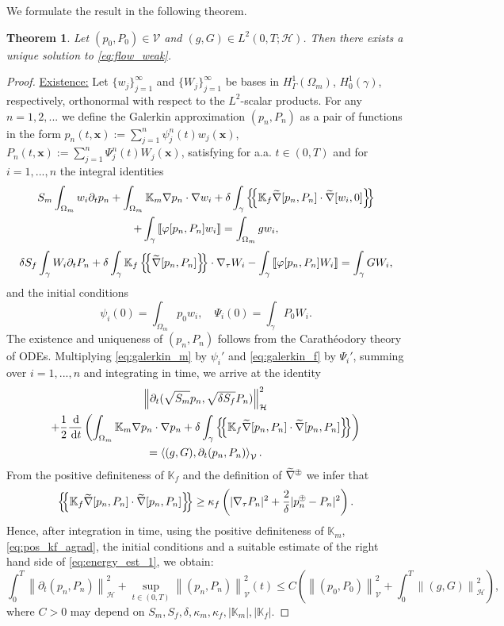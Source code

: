 \documentclass[a4paper]{article}
\newtheorem{theorem}{Theorem}
\def\agrad{\widetilde\nabla}
\def\avg#1{\left\{\mskip-5mu\left\{#1\right\}\mskip-5mu\right\}}
\def\d {\,{\rm d}}
\def\ddt#1{\frac{\d #1}{\d t}}
\def\dt{\prtl_t}
\def\dual#1#2{\left\langle #1,#2\right\rangle}
\def\Hf{\mathcal H}
\def\jmp#1{\left\llbracket #1 \right\rrbracket}
\def\norm#1{\left\|#1\right\|}
\def\pphi{{\varphi}}
\def\prtl{\partial}
\def\tn#1{{\mathbb{#1}}}    %
\def\Vf{{\mathcal V}} %
\def\vc#1{\mathbf{\boldsymbol{#1}}}     %
\def\xx{\vc x}
\newcommand{\eq}[1]{\begin{equation}#1\end{equation}}
\newcommand{\eqs}[1]{\begin{equation*}#1\end{equation*}}
\newcommand{\ml}[1]{\begin{multline}#1\end{multline}}
\newcommand{\opm}{ %
  {\mathbin{
    \mathchoice
      {\buildcirclepm{\displaystyle     }{0.14ex}{0.95}{0.05ex}{.7}}
      {\buildcirclepm{\textstyle        }{0.14ex}{0.95}{0.05ex}{.7}}
      {\buildcirclepm{\scriptstyle      }{0.13ex}{0.955}{0.04ex}{.55}}
      {\buildcirclepm{\scriptscriptstyle}{0.08ex}{0.95}{0.03ex}{.45}}
  }} 
}
\newcommand\buildcirclepm[5]{%
  \begin{tikzpicture}[baseline=(X.base), inner sep=-#5, outer sep=-.65]
    \node[draw,circle,line width=#4] (X)  {\footnotesize\raisebox{#2}{\scalebox{#3}{$#1\pm$}}};
  \end{tikzpicture}%
}
\begin{document}
We formulate the result in the following theorem.
% 
\begin{theorem}
Let $(p_0,P_0)\in\Vf$ and $(g,G)\in L^2(0,T;\Hf)$.
Then there exists a unique solution to \eqref{eq:flow_weak}.
\end{theorem}
\begin{proof}
\underline{Existence:}
Let $\{w_j\}_{j=1}^\infty$ and $\{W_j\}_{j=1}^\infty$ be bases in $H^1_\Gamma(\Omega_m)$, $H^1_0(\gamma)$, respectively, orthonormal with respect to the $L^2$-scalar products.
For any $n=1,2,...$ we define the Galerkin approximation $(p_n,P_n)$ as a pair of functions in the form $p_n(t,\xx):=\sum_{j=1}^n\psi_j^n(t)w_j(\xx)$, $P_n(t,\xx):=\sum_{j=1}^n\Psi_j^n(t)W_j(\xx)$, satisfying for a.a. $t\in(0,T)$ and for $i=1,...,n$ the integral identities
\ml{ \label{eq:galerkin_m} S_m\int_{\Omega_m}w_i\dt p_n + \int_{\Omega_m}\tn K_m\nabla p_n\cdot\nabla w_i + \delta\int_\gamma\avg{\tn K_f\agrad[p_n,P_n]\cdot\agrad[w_i,0]}\\
+ \int_\gamma\jmp{\pphi[p_n,P_n]w_i} = \int_{\Omega_m}g w_i, }
\eq{ \label{eq:galerkin_f} \delta S_f\int_\gamma W_i\dt P_n + \delta\int_\gamma\tn K_f\avg{\agrad[p_n,P_n]}\cdot\nabla_\tau W_i - \int_\gamma\jmp{\pphi[p_n,P_n]W_i} = \int_\gamma G W_i, }
and the initial conditions
\eqs{ \psi_i(0)=\int_{\Omega_m}p_0w_i, \quad \Psi_i(0)=\int_\gamma P_0W_i. }
The existence and uniqueness of $(p_n,P_n)$ follows from the Carath\'eodory theory of ODEs.
Multiplying \eqref{eq:galerkin_m} by $\psi_i'$ and \eqref{eq:galerkin_f} by $\Psi_i'$, summing over $i=1,...,n$ and integrating in time, we arrive at the identity
\ml{\label{eq:energy_est_1} \norm{\dt(\sqrt{S_m} p_n,\sqrt{\delta S_f} P_n)}_\Hf^2\\
+ \frac12\ddt{}\left(\int_{\Omega_m}\tn K_m\nabla p_n\cdot\nabla p_n
+ \delta\int_\gamma\avg{\tn K_f\agrad[p_n,P_n]\cdot\agrad[p_n,P_n]}\right)\\
= \dual{(g,G)}{\dt(p_n,P_n)}_\Vf. }
From the positive definiteness of $\tn K_f$ and the definition of $\agrad^\opm$ we infer that
\eq{ \label{eq:pos_kf_agrad} \avg{\tn K_f\agrad[p_n,P_n]\cdot\agrad[p_n,P_n]} \ge \kappa_f\left(|\nabla_\tau P_n|^2 + \frac2\delta|p_n^\opm-P_n|^2\right). }
Hence, after integration in time, using the positive definiteness of $\tn K_m$, \eqref{eq:pos_kf_agrad}, the initial conditions and a suitable estimate of the right hand side of \eqref{eq:energy_est_1}, we obtain:
\eq{ \label{eq:energy_est_flow} \int_0^T\norm{\dt(p_n,P_n)}_\Hf^2 + \sup_{t\in(0,T)}\norm{(p_n,P_n)}_\Vf^2(t) \le C\left(\norm{(p_0,P_0)}_\Vf^2 + \int_0^T\norm{(g,G)}_{\Hf}^2\right), }
where $C>0$ may depend on $S_m,S_f,\delta,\kappa_m,\kappa_f,|\tn K_m|,|\tn K_f|$.



\end{proof}
\end{document}
